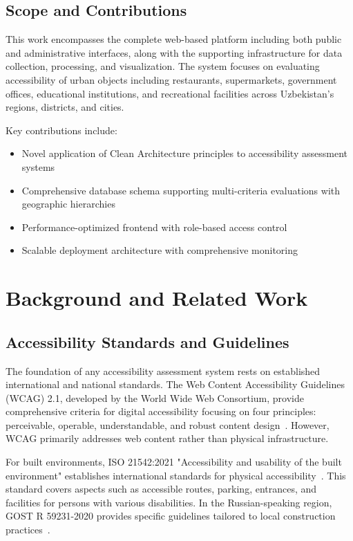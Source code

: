 \documentclass[a4paper,12pt,oneside]{book}
\begin{document}
\section{Scope and Contributions}
This work encompasses the complete web-based platform including both public and administrative interfaces, along with the supporting infrastructure for data collection, processing, and visualization. The system focuses on evaluating accessibility of urban objects including restaurants, supermarkets, government offices, educational institutions, and recreational facilities across Uzbekistan's regions, districts, and cities.

Key contributions include:
\begin{itemize}
    \item Novel application of Clean Architecture principles to accessibility assessment systems
    \item Comprehensive database schema supporting multi-criteria evaluations with geographic hierarchies
    \item Performance-optimized frontend with role-based access control
    \item Scalable deployment architecture with comprehensive monitoring
\end{itemize}

\chapter{Background and Related Work}
\section{Accessibility Standards and Guidelines}

The foundation of any accessibility assessment system rests on established international and national standards. The Web Content Accessibility Guidelines (WCAG) 2.1, developed by the World Wide Web Consortium, provide comprehensive criteria for digital accessibility focusing on four principles: perceivable, operable, understandable, and robust content design~\cite{wcag21}. However, WCAG primarily addresses web content rather than physical infrastructure.

For built environments, ISO 21542:2021 "Accessibility and usability of the built environment" establishes international standards for physical accessibility~\cite{iso21542}. This standard covers aspects such as accessible routes, parking, entrances, and facilities for persons with various disabilities. In the Russian-speaking region, GOST R 59231-2020 provides specific guidelines tailored to local construction practices~\cite{gost_r}.
\end{document}
